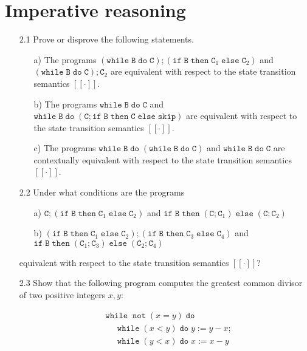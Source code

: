 \documentclass{article}
\newcommand{\B}{\mathtt{B}}
\newcommand{\C}{\mathtt{C}}
\newcommand{\notsym}{\mathop{\mathtt{not}}}
\newcommand{\ifsym}{\mathtt{if}}
\newcommand{\then}{\mathtt{then}}
\newcommand{\elsesym}{\mathtt{else}}
\newcommand{\whilesym}{\mathtt{while}}
\newcommand{\dosym}{\mathtt{do}}
\newcommand{\skipsym}{\mathtt{skip}}
\newcommand{\question}[1]
{\color{DarkBlue}#1 \color{Black}}
\begin{document}
\section{Imperative reasoning}
\begin{enumerate}

\question{
\item[2.1] Prove or disprove the following statements.
\begin{enumerate}
\item[a)] The programs $(\whilesym\; \B \; \dosym \; \C); (\ifsym \; \B \; \then \; \C_1 \; \elsesym \; \C_2)$ and $(\whilesym \; \B \; \dosym \; \C);\C_2$
are equivalent with respect to the state transition semantics $[[\cdot]]$.

\item[b)] The programs $\whilesym\; \B \; \dosym \; \C$ and $\whilesym \; \B \; \dosym \; (\C;\ifsym \; \B \; \then \; \C \; \elsesym \; \skipsym)$ are 
equivalent with respect to the state transition semantics $[[\cdot]]$.

\item[c)] The programs $\whilesym\; \B \; \dosym \; (\whilesym \; \B \; \dosym \; \C)$ and $\whilesym\; \B \; \dosym \; \C$ are 
contextually equivalent with respect to the state transition semantics $[[\cdot]]$.
\end{enumerate}
}

\question{
\item[2.2] Under what conditions are the programs
\begin{enumerate} 

\item[a)] $\C;(\ifsym \; \B \; \then\; \C_1\; \elsesym \; \C_2)$ and $\ifsym \; \B \; \then\; (\C; \C_1) \; \elsesym \; (\C; \C_2)$
\item[b)] $(\ifsym \; \B \; \then\; \C_1 \; \elsesym \; \C_2); (\ifsym \; \B \; \then \; \C_3 \; \elsesym \; \C_4)$ and $\ifsym \; \B \; \then\; (\C_1;\C_3) \; \elsesym \; (\C_2;\C_4)$
\end{enumerate}

equivalent with respect to the state transition semantics $[[\cdot]]$?
}

\question{
\item[2.3] Show that the following program computes the greatest common divisor of two positive integers $x,y$:

\begin{align*}
& \whilesym \; \notsym(x = y) \; \dosym \\
& \;\;\;\;\; \whilesym \; (x < y) \; \dosym \; y := y - x; \\
& \;\;\;\;\; \whilesym \; (y < x) \; \dosym \; x := x - y
\end{align*}

}
\end{enumerate}
\end{document}
